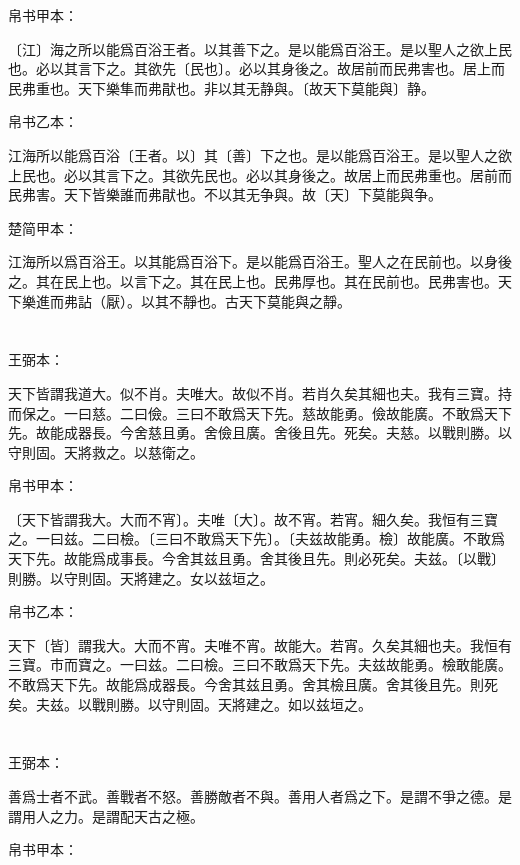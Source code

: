 \documentclass[a5paper]{ctexbook}
\begin{document}
    
    帛书甲本：

    〔江〕海之所以能爲百浴王者。以其善下之。是以能爲百浴王。是以聖人之欲上民也。必以其言下之。其欲先〔民也〕。必以其身後之。故居前而民弗害也。居上而民弗重也。天下樂隼而弗猒也。非以其无静與。〔故天下莫能與〕静。

    帛书乙本：

    江海所以能爲百浴〔王者。以〕其〔善〕下之也。是以能爲百浴王。是以聖人之欲上民也。必以其言下之。其欲先民也。必以其身後之。故居上而民弗重也。居前而民弗害。天下皆樂誰而弗猒也。不以其无争與。故〔天〕下莫能與争。

    楚简甲本：

    江海所以爲百浴王。以其能爲百浴下。是以能爲百浴王。聖人之在民前也。以身後之。其在民上也。以言下之。其在民上也。民弗厚也。其在民前也。民弗害也。天下樂進而弗詀（厭）。以其不靜也。古天下莫能與之靜。

    \chapter{}
    王弼本：

    天下皆謂我道大。似不肖。夫唯大。故似不肖。若肖久矣其細也夫。我有三寶。持而保之。一曰慈。二曰儉。三曰不敢爲天下先。慈故能勇。儉故能廣。不敢爲天下先。故能成器長。今舍慈且勇。舍儉且廣。舍後且先。死矣。夫慈。以戰則勝。以守則固。天將救之。以慈衛之。

    
    帛书甲本：

    〔天下皆謂我大。大而不宵〕。夫唯〔大〕。故不宵。若宵。細久矣。我恒有三寶之。一曰兹。二曰檢。〔三曰不敢爲天下先〕。〔夫兹故能勇。檢〕故能廣。不敢爲天下先。故能爲成事長。今舍其兹且勇。舍其後且先。則必死矣。夫兹。〔以戰〕則勝。以守則固。天將建之。女以兹垣之。

    帛书乙本：

    天下〔皆〕謂我大。大而不宵。夫唯不宵。故能大。若宵。久矣其細也夫。我恒有三寶。市而寶之。一曰兹。二曰檢。三曰不敢爲天下先。夫兹故能勇。檢敢能廣。不敢爲天下先。故能爲成器長。今舍其兹且勇。舍其檢且廣。舍其後且先。則死矣。夫兹。以戰則勝。以守則固。天將建之。如以兹垣之。

    \chapter{}
    王弼本：

    善爲士者不武。善戰者不怒。善勝敵者不與。善用人者爲之下。是謂不爭之德。是謂用人之力。是謂配天古之極。

    
    帛书甲本：
\end{document}
